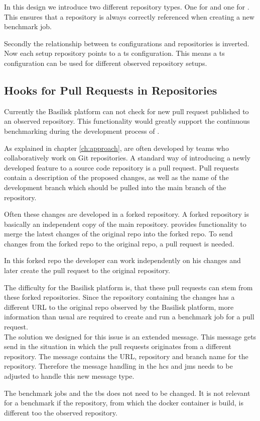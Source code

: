 In this design we introduce two different repository types.
One for \gh{} and one for \dockh{}.
This ensures that a repository is always correctly referenced when creating a new benchmark job.

Secondly the relationship between \ac{ts} configurations and repositories is inverted. 
Now each setup repository points to a \ac{ts} configuration.
This means a \ac{ts} configuration can be used for different observed repository setups.



\subsection{Hooks for Pull Requests in \gh{} Repositories}
Currently the Basilisk platform can not check for new pull request published to an observed repository.
This functionality would greatly support the continuous benchmarking during the development process of \tsp{}.

As explained in chapter \ref{ch:approach}, \tsp{} are often developed by teams who collaboratively work on Git repositories.
A standard way of introducing a newly developed feature to a source code repository is a pull request.
Pull requests contain a description of the proposed changes, as well as the name of the development branch which should be pulled into the main branch of the repository.

Often these changes are developed in a forked repository.
A forked repository is basically an independent copy of the main repository.
\gh{} provides functionality to merge the latest changes of the original repo into the forked repo.
To send changes from the forked repo to the original repo, a pull request is needed.

In this forked repo the developer can work independently on his changes and later create the pull request to the original repository.

The difficulty for the Basilisk platform is, that these pull requests can stem from these forked repositories.
Since the repository containing the changes has a different URL to the original repo observed by the Basilisk platform, more information than usual are required to create and run a benchmark job for a pull request.
\\

The solution we designed for this issue is an extended message.
This message gets send in the situation in which the pull requests originates from a different repository.
The message contains the URL, repository and branch name for the \gh{} repository.
Therefore the message handling in the \ac{hcs} and \ac{jms} needs to be adjusted to handle this new message type.

The benchmark jobs and the \acl{tbs} does not need to be changed.
It is not relevant for a benchmark if the repository, from which the docker container is build, is different too the observed repository.



